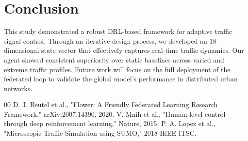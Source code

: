 \documentclass[conference]{IEEEtran}
\begin{document}
\section{Conclusion}
This study demonstrated a robust DRL-based framework for adaptive traffic signal control. Through an iterative design process, we developed an 18-dimensional state vector that effectively captures real-time traffic dynamics. Our agent showed consistent superiority over static baselines across varied and extreme traffic profiles. Future work will focus on the full deployment of the federated loop to validate the global model's performance in distributed urban networks.

\begin{thebibliography}{00}
 D. J. Beutel et al., "Flower: A Friendly Federated Learning Research Framework," arXiv:2007.14390, 2020.
 V. Mnih et al., "Human-level control through deep reinforcement learning," Nature, 2015.
 P. A. Lopez et al., "Microscopic Traffic Simulation using SUMO," 2018 IEEE ITSC.
\end{thebibliography}
\end{document}
